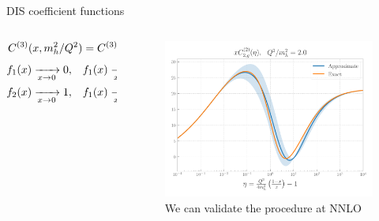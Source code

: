 \documentclass[8pt,t]{beamer}
\begin{document}
\begin{frame}{DIS coefficient functions}
  \vspace*{-0.5em}
  \begin{columns}
    \begin{column}{0.49\textwidth}
      \begin{equation*}
        C^{(3)}(x,m_h^2/Q^2) = C^{(3),{\rm thr}}(x,m_h^2/Q^2) f_1(x) + C^{(3),{\rm asy}}(x,m_h^2/Q^2) f_2(x)
      \end{equation*}
      \begin{align*}
        \begin{split}
            f_1(x) \xrightarrow[x \to 0]{} 0, & \quad  f_1(x) \xrightarrow[x \to x_{\rm max}]{} 1 \, , \\
            f_2(x) \xrightarrow[x \to 0]{} 1, & \quad  f_1(x) \xrightarrow[x \to x_{\rm max}]{} 0 \, ,
        \end{split}
      \end{align*}
    \end{column}
    \begin{column}{0.49\textwidth}
      \vspace*{1.5em}
      \begin{figure}[!t]
        \centering
        \includegraphics[width=.7\textwidth]{figures/C2g_2_Q2m2_2.0.pdf}
        \caption*{We can validate the procedure at NNLO}
      \end{figure}
    \end{column}
  \end{columns}
\end{frame}
\end{document}
